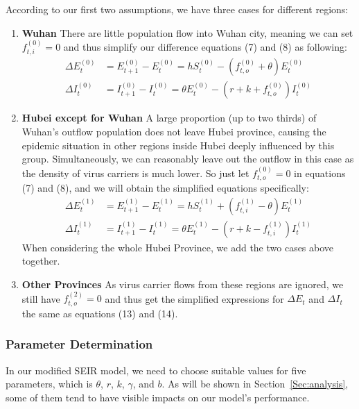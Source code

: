 \documentclass[12pt]{mcmthesis}
\begin{document}
According to our first two assumptions, we have three cases for different regions:
\begin{enumerate}
    \item \textbf{Wuhan} There are little population flow into Wuhan city, meaning we can set $f_{t,i}^{(0)} = 0$ and thus simplify our difference equations (7) and (8) as following:
    \begin{align}
        \Delta E_t^{(0)} &= E_{t+1}^{(0)} - E_t^{(0)} = hS_t^{(0)} - \left(f_{t,o}^{(0)} + \theta\right)E_t^{(0)} \\
        \Delta I_t^{(0)} &= I_{t+1}^{(0)} - I_t^{(0)} = \theta E_t^{(0)} - \left(r + k + f_{t,o}^{(0)}\right)I_t^{(0)}
    \end{align}
    \item \textbf{Hubei except for Wuhan} A large proportion (up to two thirds) of Wuhan's outflow population does not leave Hubei province, causing the epidemic situation in other regions inside Hubei deeply influenced by this group. Simultaneously, we can reasonably leave out the outflow in this case as the density of virus carriers is much lower. So just let $f_{t,o}^{(0)} = 0$ in equations (7) and (8), and we will obtain the simplified equations specifically:
    \begin{align}
        \Delta E_t^{(1)} &= E_{t+1}^{(1)} - E_t^{(1)} = hS_t^{(1)} + \left(f_{t,i}^{(1)} - \theta\right)E_t^{(1)} \\
        \Delta I_t^{(1)} &= I_{t+1}^{(1)} - I_t^{(1)} = \theta E_t^{(1)} - \left(r + k - f_{t,i}^{(1)}\right)I_t^{(1)}
    \end{align}
    When considering the whole Hubei Province, we add the two cases above together.
    \item \textbf{Other Provinces} As virus carrier flows from these regions are ignored, we still have $f_{t,o}^{(2)} = 0$ and thus get the simplified expressions for $\Delta E_t$ and $\Delta I_t$ the same as equations (13) and (14).
\end{enumerate}

\subsubsection{Parameter Determination} \label{subSec:Para}
In our modified SEIR model, we need to choose suitable values for five parameters, which is $\theta$, $r$, $k$, $\gamma$, and $b$. As will be shown in Section~\ref{Sec:analysis}, some of them tend to have visible impacts on our model’s performance.
\end{document}

